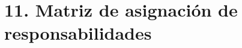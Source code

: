\documentclass[11pt]{charter}
\begin{document}

\newpage
\section{11. Matriz de asignación de responsabilidades}
\label{sec:responsabilidades}
\end{document}
